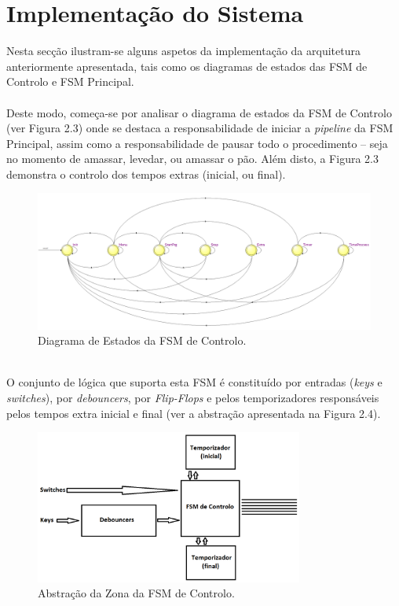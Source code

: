 \documentclass{report}
\begin{document}
\section{Implementação do Sistema}
Nesta secção ilustram-se alguns aspetos da implementação da arquitetura anteriormente apresentada, tais como os diagramas de estados das FSM de Controlo e FSM Principal.
\\\\
Deste modo, começa-se por analisar o diagrama de estados da FSM de Controlo (ver Figura 2.3) onde se destaca a responsabilidade de iniciar a \textit{pipeline} da FSM Principal, assim como a responsabilidade de pausar todo o procedimento -- seja no momento de amassar, levedar, ou amassar o pão. Além disto, a Figura 2.3 demonstra o controlo dos tempos extras (inicial, ou final).
\begin{figure}[h!] %
	\center
	\includegraphics[width=350pt]{images/FSM1_2}
	\caption{Diagrama de Estados da FSM de Controlo.}
	\label{fig:imagem3}
\end{figure}
\\
O conjunto de lógica que suporta esta FSM é constituído por entradas (\textit{keys} e \textit{switches}), por \textit{debouncers}, por \textit{Flip-Flops} e pelos temporizadores responsáveis pelos tempos extra inicial e final (ver a abstração apresentada na Figura 2.4).
\begin{figure}[h!] %
	\center
	\includegraphics[width=250pt]{images/FSM1_Abstracao}
	\caption{Abstração da Zona da FSM de Controlo.}
	\label{fig:imagem4}
\end{figure}
\end{document}

